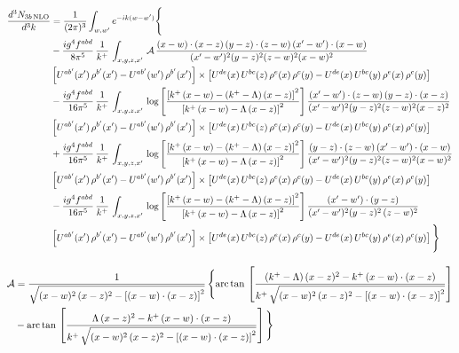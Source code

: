 \documentclass[9pt]{article}
\numberwithin{equation}{section}
\begin{document}
\begin{align}
\frac{d^{3}N_{3b\,\rm NLO}}{d^{3}k} & =\frac{1}{(2\pi)^{3}}\int_{w,w'}e^{-ik(w-w')}\Bigg\{\notag \\ &-\frac{ig^{4}f^{abd}}{8\pi^{5}}\,\frac{1}{k^{+}}\,\int_{x,y,z,x'}\,\mathcal{A}\,
\frac{(x-w)\cdot(x-z)\,(y-z)\cdot(z-w)\,(x'-w')\cdot(x-w)}{(x'-w')^{2}(y-z)^{2}(z-w)^{2}(x-w)^{2}}\notag \\ & \left[U^{ab'}(x')\,\rho^{b'}(x')-U^{ab'}(w')\, \rho^{b'}(x')\right]\times \left[U^{de}(x)\,U^{bc}(z)\, \rho^{e}(x)\,\rho^{c}(y)-U^{de}(x)\,U^{bc}(y)\,\rho^{e}(x)\,\rho^{c}(y)\right]\notag \\ & -\frac{ig^{4}f^{abd}}{16\pi^{5}}\,\frac{1}{k^{+}}\,\int_{x,y,z,x'}\,\log{\left[\frac{\left[k^{+}\,(x-w)-(k^{+}-\Lambda)\,(x-z)\right]^{2}}{\left[k^{+}\,(x-w)-\Lambda\,(x-z)\right]^{2}}\right]}\,
\frac{(x'-w')\cdot(z-w)\,(y-z)\cdot(x-z)}{(x'-w')^{2}(y-z)^{2}(z-w)^{2}(x-z)^{2}}\notag \\
&\left[U^{ab'}(x')\,\rho^{b'}(x')-U^{ab'}(w')\, \rho^{b'}(x')\right]\times \left[U^{de}(x)\,U^{bc}(z)\, \rho^{e}(x)\,\rho^{c}(y)-U^{de}(x)\,U^{bc}(y)\,\rho^{e}(x)\,\rho^{c}(y)\right]\notag \\ &+ \frac{ig^{4}f^{abd}}{16\pi^{5}}\,\frac{1}{k^{+}}\,\int_{x,y,z,x'}\,\log{\left[\frac{\left[k^{+}\,(x-w)-(k^{+}-\Lambda)\,(x-z)\right]^{2}}{\left[k^{+}\,(x-w)-\Lambda\,(x-z)\right]^{2}}\right]}\,
\frac{(y-z)\cdot(z-w)\,(x'-w')\cdot(x-w)}{(x'-w')^{2}(y-z)^{2}(z-w)^{2}(x-w)^{2}}\notag \\ 
& \left[U^{ab'}(x')\,\rho^{b'}(x')-U^{ab'}(w')\, \rho^{b'}(x')\right]\times \left[U^{de}(x)\,U^{bc}(z)\, \rho^{e}(x)\,\rho^{c}(y)-U^{de}(x)\,U^{bc}(y)\,\rho^{e}(x)\,\rho^{c}(y)\right]\notag \\ & -\frac{ig^{4}f^{abd}}{16\pi^{5}}\,\frac{1}{k^{+}}\,\int_{x,y,z,x'}\,\log{\left[\frac{\left[k^{+}\,(x-w)-(k^{+}-\Lambda)\,(x-z)\right]^{2}}{\left[k^{+}\,(x-w)-\Lambda\,(x-z)\right]^{2}}\right]}\,
\frac{(x'-w')\cdot(y-z)}{(x'-w')^{2}(y-z)^{2}\,(z-w)^{2}}\notag \\ & \left[U^{ab'}(x')\,\rho^{b'}(x')-U^{ab'}(w')\, \rho^{b'}(x')\right]\times \left[U^{de}(x)\,U^{bc}(z)\, \rho^{e}(x)\,\rho^{c}(y)-U^{de}(x)\,U^{bc}(y)\,\rho^{e}(x)\,\rho^{c}(y)\right]\Bigg\}
\end{align}

\begin{align}
\mathcal{A} & = \frac{1}{\sqrt{(x-w)^{2}\,(x-z)^{2}-\left[(x-w)\cdot (x-z)\right]^{2}}}\, \Bigg\{\mathrm{arc\,tan}\,\left[\frac{(k^{+}-\Lambda)\,(x-z)^{2}-k^{+}\,(x-w)\cdot (x-z)}{k^{+}\,\sqrt{(x-w)^{2}\,(x-z)^{2}-\left[(x-w)\cdot (x-z)\right]^{2}}}\right]\notag \\ & - \mathrm{arc\,tan}\,\left[\frac{\Lambda\,(x-z)^{2}-k^{+}\,(x-w)\cdot (x-z)}{k^{+}\,\sqrt{(x-w)^{2}\,(x-z)^{2}-\left[(x-w)\cdot (x-z)\right]^{2}}}\right] \Bigg\} \nonumber
\end{align}
\end{document}

